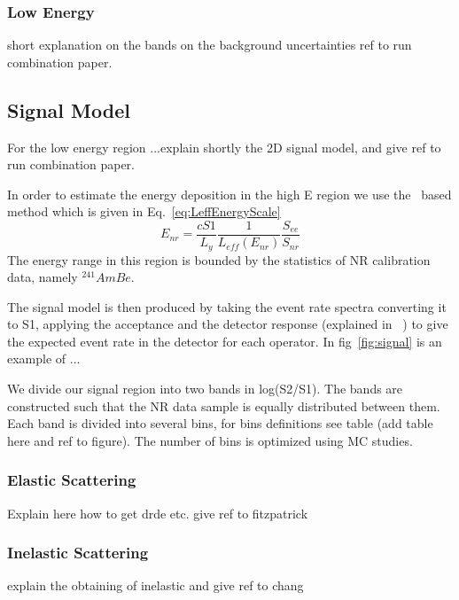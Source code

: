 \subsubsection{Low Energy}
short explanation on the bands on the background  uncertainties ref to run combination paper.

\subsection{Signal Model}
For the low energy region ...explain shortly the 2D signal model, and give ref to run combination paper.

In order to estimate the energy deposition in the high E region we use the \Leff\ based method which is given in Eq.~\ref{eq:LeffEnergyScale}
\begin{equation}
\label{eq:LeffEnergyScale}
	E_{nr} = \frac{cS1}{L_y} \frac{1}{L_{eff}(E_{nr})} \frac{S_{ee}}{S_{nr}}
\end{equation}
The energy range in this region is bounded by the statistics of NR calibration data, namely $^{241}AmBe$.

The signal model is then produced by taking the event rate spectra converting it to S1, applying the acceptance and the detector response (explained in ~\cite{xe100_ana2012}) to give the expected event rate in the detector for each operator. In fig~\ref{fig:signal} is an example of ...

We divide our signal region into two bands in log(S2/S1). The bands are constructed such that the NR data sample is equally distributed between them. Each band is divided into several bins, for bins definitions see table (add table here and ref to figure). The number of bins is optimized using MC studies.



\subsubsection{Elastic Scattering}
Explain here how to get drde etc. give ref to fitzpatrick
\subsubsection{Inelastic Scattering}
explain the obtaining of inelastic and give ref to chang